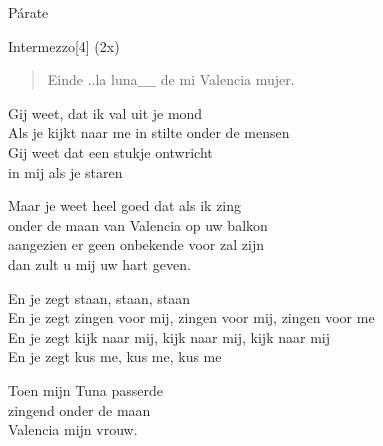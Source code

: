 \begin{song}{Párate}
\begin{instrumental}{Intermezzo}[4]
  \measure{} \measure{}
    (2x)
\end{instrumental}


\begin{verse}{Einde}
\chord{(*)}..la luna$\_\_\_$$\_$ de mi Valencia mujer.  \hspace{0.8em} \hspace{1.3em} 
\end{verse}
\end{song}

\clearpage
\begin{translation}
Gij weet, dat ik val uit je mond\\
Als je kijkt naar me in stilte onder de mensen\\
Gij weet dat een stukje ontwricht\\
in mij als je staren\vspace{\wlskip}

Maar je weet heel goed dat als ik zing\\
onder de maan van Valencia op uw balkon\\
aangezien er geen onbekende voor zal zijn\\
dan zult u mij uw hart geven.\vspace{\wlskip}

En je zegt staan, staan, staan\\
En je zegt zingen voor mij, zingen voor mij, zingen voor me\\
En je zegt kijk naar mij, kijk naar mij, kijk naar mij\\
En je zegt kus me, kus me, kus me\vspace{\wlskip}

Toen mijn Tuna passerde\\
zingend onder de maan\\
Valencia mijn vrouw.
\end{translation}
